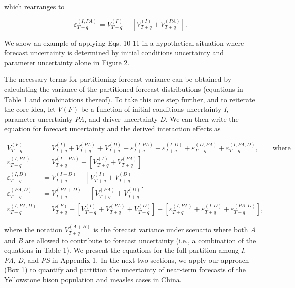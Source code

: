 \documentclass[12pt,]{article}
\begin{document}
\noindent{}which rearranges to

\begin{equation}
\varepsilon_{T+q}^{(I,PA)} = V^{(F)}_{T+q} - \left[ V^{(I)}_{T+q} + V^{(PA)}_{T+q} \right].
\end{equation}

\noindent{}We show an example of applying Eqs. 10-11 in a hypothetical
situation where forecast uncertainty is determined by initial conditions
uncertainty and parameter uncertainty alone in Figure 2.

The necessary terms for partitioning forecast variance can be obtained
by calculating the variance of the partitioned forecast distributions
(equations in Table 1 and combinations thereof). To take this one step
further, and to reiterate the core idea, let \(V(F)\) be a function of
initial conditions uncertainty \emph{I}, parameter uncertainty
\emph{PA}, and driver uncertainty \emph{D}. We can then write the
equation for forecast uncertainty and the derived interaction
effects
as

\begin{align}
V^{(F)}_{T+q} &= V^{(I)}_{T+q} + V^{(PA)}_{T+q} + V^{(D)}_{T+q} + \varepsilon^{(I,PA)}_{T+q} + \varepsilon^{(I,D)}_{T+q} + \varepsilon^{(D,PA)}_{T+q} + \varepsilon^{(I,PA,D)}_{T+q}, \qquad \text{where} \\
\varepsilon^{(I,PA)}_{T+q} &= V^{(I+PA)}_{T+q} - \left[V^{(I)}_{T+q} + V^{(PA)}_{T+q}\right] \\
\varepsilon^{(I,D)}_{T+q} &= V^{(I+D)}_{T+q} - \left[V^{(I)}_{T+q} + V^{(D)}_{T+q}\right] \\
\varepsilon^{(PA,D)}_{T+q} &= V^{(PA+D)}_{T+q} - \left[V^{(PA)}_{T+q} + V^{(D)}_{T+q}\right] \\
\varepsilon^{(I,PA,D)}_{T+q} &= V^{(F)}_{T+q} - \left[V^{(I)}_{T+q} + V^{(PA)}_{T+q} + V^{(D)}_{T+q}\right] - \left[\varepsilon^{(I,PA)}_{T+q} + \varepsilon^{(I,D)}_{T+q} + \varepsilon^{(PA,D)}_{T+q} \right],
\end{align}

\noindent{}where the notation \(V^{(A+B)}_{T+q}\) is the forecast
variance under scenario where both \emph{A} and \emph{B} are allowed to
contribute to forecast uncertainty (i.e., a combination of the equations
in Table 1). We present the equations for the full partition among
\emph{I}, \emph{PA}, \emph{D}, and \emph{PS} in Appendix 1. In the next
two sections, we apply our approach (Box 1) to quantify and partition
the uncertainty of near-term forecasts of the Yellowstone bison
population and measles cases in China.
\end{document}
